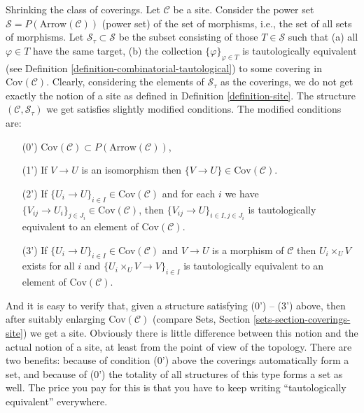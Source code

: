 \begin{remark}
\label{remark-shrink-coverings}
Shrinking the class of coverings. Let $\mathcal{C}$
be a site. Consider the power set
$\mathcal{S} = P(\text{Arrow}(\mathcal{C}))$ (power set)
of the set of morphisms, i.e., the set
of all sets of morphisms. Let $\mathcal{S}_\tau \subset \mathcal{S}$
be the subset consisting of those $T \in \mathcal{S}$ such that
(a) all $\varphi \in T$ have the same target,
(b) the collection $\{\varphi\}_{\varphi \in T}$ is tautologically
equivalent (see Definition \ref{definition-combinatorial-tautological})
to some covering in $\text{Cov}(\mathcal{C})$.
Clearly, considering the elements of $\mathcal{S}_\tau$ as
the coverings, we do not get exactly the notion of a site
as defined in Definition \ref{definition-site}.
The structure $(\mathcal{C}, \mathcal{S}_\tau)$
we get satisfies slightly modified conditions. The modified
conditions are:
\begin{enumerate}
\item[(0')] $\text{Cov}(\mathcal{C}) \subset P(\text{Arrow}(\mathcal{C}))$,
\item[(1')] If $V \to U$ is an isomorphism then $\{V \to U\} \in
\text{Cov}(\mathcal{C})$.
\item[(2')] If $\{U_i \to U\}_{i\in I} \in \text{Cov}(\mathcal{C})$
and for each $i$ we have
$\{V_{ij} \to U_i\}_{j\in J_i} \in \text{Cov}(\mathcal{C})$, then
$\{V_{ij} \to U\}_{i \in I, j\in J_i}$ is tautologically
equivalent to an element of $\text{Cov}(\mathcal{C})$.
\item[(3')] If $\{U_i \to U\}_{i\in I}\in \text{Cov}(\mathcal{C})$
and $V \to U$ is a morphism of $\mathcal{C}$ then $U_i \times_U V$
exists for all $i$ and $\{U_i \times_U V \to V \}_{i\in I}$
is tautologically equivalent to an element of $\text{Cov}(\mathcal{C})$.
\end{enumerate}
And it is easy to verify that, given a structure satisfying
(0') -- (3') above, then after suitably enlarging
$\text{Cov}(\mathcal{C})$ (compare Sets,
Section \ref{sets-section-coverings-site}) we get a site.
Obviously there is little difference between this notion and the
actual notion of a site, at least from the point of view of the
topology. There are two benefits:
because of condition (0') above the coverings automatically
form a set, and because of (0') the totality of all structures
of this type forms a set as well.
The price you pay for this is that you have to keep writing
``tautologically equivalent'' everywhere.
\end{remark}

















